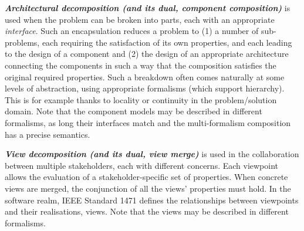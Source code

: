 \noindent
\textbf{\emph{Architectural decomposition (and its dual, component composition)}} is used when
    the problem can be broken into parts, each with an appropriate \emph{interface}.
    Such an encapsulation reduces a problem to (1) a number of sub-problems, each requiring 
    the satisfaction of its own properties, and each leading to the 
    design of a component and (2) the design of an appropriate architecture connecting the components in such a way that the composition satisfies the original required properties.
    Such a breakdown often comes naturally at some levels of abstraction, using appropriate formalisms (which support hierarchy).
    This is for example thanks to locality or continuity in the problem/solution domain.
    Note that the component models may be described in different formalisms, as long their interfaces match and the multi-formalism composition has a precise semantics.
    
\noindent
\textbf{\emph{View decomposition (and its dual, view merge)}} is used in the 
    collaboration between multiple stakeholders, each with different concerns.
    Each viewpoint allows the evaluation of a stakeholder-specific set of properties. 
    When concrete views are merged, the conjunction of all the views' properties must hold.
    In the software realm, IEEE Standard 1471 defines the relationships between viewpoints and 
    their realisations, views.
    Note that the views may be described in different formalisms.



% 


%


